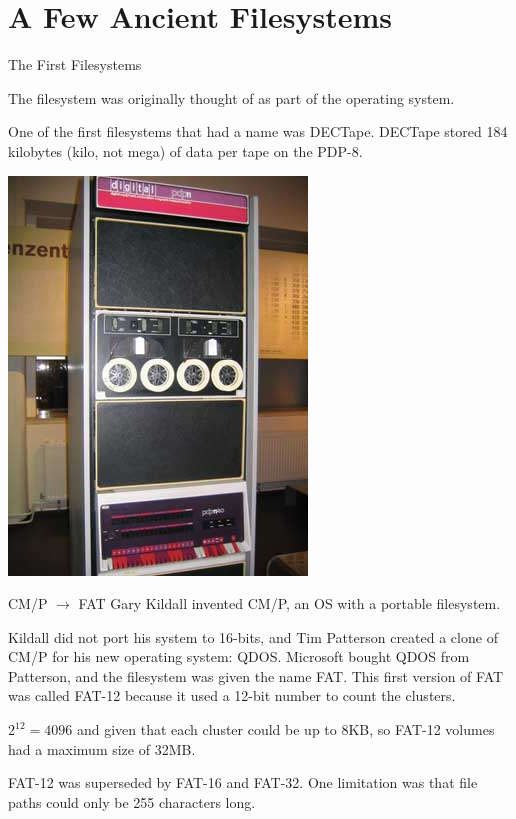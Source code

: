 \documentclass{lug}
\newcommand{\splitslide}[4]{
    \noindent
    \begin{minipage}{#1 \textwidth - #2 }
        #3
    \end{minipage}%
    \hspace{ \dimexpr #2 * 2 \relax }%
    \begin{minipage}{\textwidth - #1 \textwidth - #2 }
        #4
    \end{minipage}
}
\begin{document}
\section{A Few Ancient Filesystems}
\begin{frame}{The First Filesystems}
    \splitslide{0.60}{1em}{
        The filesystem was originally thought of as part of the operating
        system.

        One of the first filesystems that had a name was DECTape. DECTape stored
        184 kilobytes (kilo, not mega) of data per tape on the PDP-8.
    }{\includegraphics[width=0.4\textheight]{./graphics/dectape.jpg}}
\end{frame}

\begin{frame}{CM/P $\rightarrow$ FAT}
    Gary Kildall invented CM/P, an OS with a portable filesystem.

    Kildall did not port his system to 16-bits, and Tim Patterson created a
    clone of CM/P for his new operating system: QDOS. Microsoft bought QDOS from
    Patterson, and the filesystem was given the name FAT. This first version of
    FAT was called FAT-12 because it used a 12-bit number to count the clusters.

    $2^{12} = 4096$ and given that each cluster could be up to 8KB, so FAT-12
    volumes had a maximum size of 32MB.

    FAT-12 was superseded by FAT-16 and FAT-32. One limitation was that file
    paths could only be 255 characters long.
\end{frame}
\end{document}
